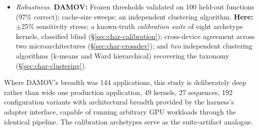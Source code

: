 \begin{itemize}
    \item \emph{Robustness.} \textbf{DAMOV:} Frozen thresholds validated on 100 held-out functions (97\% correct); cache-size sweeps; an independent clustering algorithm. \textbf{Here:} $\pm$25\% sensitivity stress; a known-truth \emph{calibration suite} of eight archetype kernels, classified blind (\S\ref{sec:char-calibration}); cross-device agreement across two microarchitectures (\S\ref{sec:char-crossdev}); and \emph{two} independent clustering algorithms (k-means and Ward hierarchical) recovering the taxonomy (\S\ref{sec:char-clustering}).
\end{itemize}

Where DAMOV's breadth was 144 applications, this study is deliberately deep rather than wide one production application, 49 kernels, 27 sequences, 192 configuration variants with architectural breadth provided by the harness's adapter interface, capable of running arbitrary GPU workloads through the identical pipeline. The calibration archetypes serve as the suite-artifact analogue.

